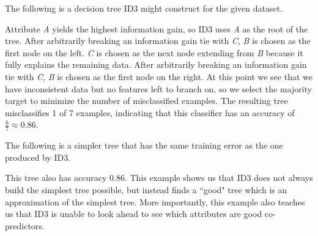 \documentclass[solution, letterpaper]{cs121}
\begin{document}
\subproblem The following is a decision tree ID3 might construct for the given dataset.

\begin{center}
\end{center}

Attribute \emph{A} yields the highest information gain, so ID3 uses \emph{A} as the root of the tree. After arbitrarily breaking an information gain tie with \emph{C}, \emph{B} is chosen as the first node on the left. \emph{C} is chosen as the next node extending from \emph{B} because it fully explains the remaining data. After arbitrarily breaking an information gain tie with \emph{C}, \emph{B} is chosen as the first node on the right. At this point we see that we have inconsistent data but no features left to branch on, so we select the majority target to minimize the number of misclassified examples. The resulting tree misclassifies 1 of 7 examples, indicating that this classifier has an accuracy of $\frac{6}{7} \approx 0.86$.


\subproblem The following is a simpler tree that has the same training error as the one produced by ID3.

\begin{center}
\end{center}

This tree also has accuracy 0.86. This example shows us that ID3 does not always build the simplest tree possible, but instead finds a ``good" tree which is an approximation of the simplest tree. More importantly, this example also teaches us that ID3 is unable to look ahead to see which attributes are good co-predictors. 
\end{document}
